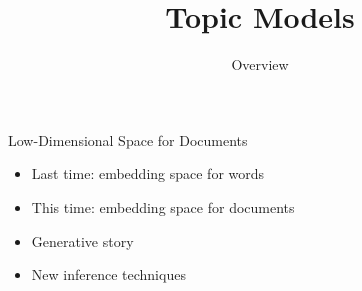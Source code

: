 \documentclass[compress]{beamer}
\title{Topic Models}
\date{Overview}
\begin{document}
\frame{\titlepage
}

\begin{frame}{Low-Dimensional Space for Documents}

  \begin{itemize}
    \item Last time: embedding space for words
    \item This time: embedding space for documents
    \item Generative story
    \item New inference techniques
  \end{itemize}

\end{frame}


%

\begin{frame}

\tiny

\end{frame}
\end{document}
